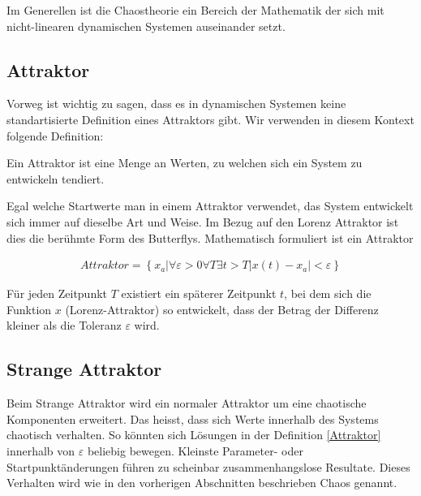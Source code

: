 Im Generellen ist die Chaostheorie ein Bereich der Mathematik der sich mit nicht-linearen dynamischen Systemen auseinander setzt.


\subsection{Attraktor}

Vorweg ist wichtig zu sagen, dass es in dynamischen Systemen keine standartisierte Definition eines Attraktors gibt. Wir verwenden in diesem Kontext folgende Definition: 
\begin{center}
	Ein Attraktor ist eine Menge an Werten, zu welchen sich ein System zu entwickeln tendiert.
\end{center} Egal welche Startwerte man in einem Attraktor verwendet, das System entwickelt sich immer auf dieselbe Art und Weise. Im Bezug auf den Lorenz Attraktor ist dies die berühmte Form des Butterflys. Mathematisch formuliert ist ein Attraktor 

\begin{align}%
\label{Attraktor}Attraktor = \left\{ x_a | \forall \varepsilon > 0
\forall T \exists t > T
|x(t) - x_a| < \varepsilon \right\} 
\end{align}

Für jeden Zeitpunkt $T$ existiert ein späterer Zeitpunkt $t$, bei dem sich die Funktion $x$ (Lorenz-Attraktor) so entwickelt, dass der Betrag der Differenz kleiner als die Toleranz $\varepsilon$ wird.

\subsection{Strange Attraktor}
Beim Strange Attraktor wird ein normaler Attraktor um eine chaotische Komponenten erweitert. Das heisst, dass sich Werte innerhalb des Systems chaotisch verhalten. So könnten sich Lösungen in der Definition \eqref{Attraktor} innerhalb von $\varepsilon$ beliebig bewegen. Kleinste Parameter- oder Startpunktänderungen führen zu scheinbar zusammenhangslose Resultate. Dieses Verhalten wird wie in den vorherigen Abschnitten beschrieben Chaos genannt.

